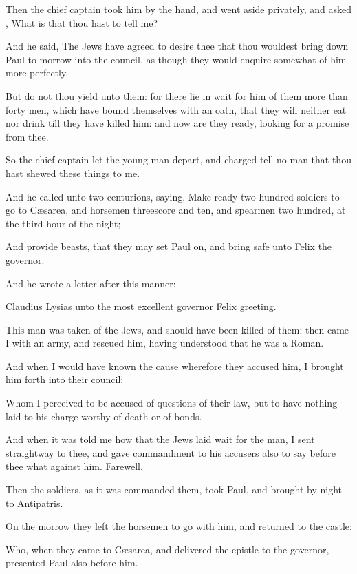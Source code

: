 {Then the chief
captain
took
him by the
hand,
and
went
{}
aside
privately, and
asked
{},
What
is
that thou
hast to
tell
me?

And he
said, The
Jews have
agreed to
desire
thee
that thou wouldest bring
down
Paul to
morrow
into the
council, as
though they would
enquire
somewhat
of
him
more
perfectly.

But
do
not
thou
yield unto
them:
for there lie in
wait for
him
of
them
more than
forty
men,
which have
bound
themselves with an
oath,
that they
will
neither
eat
nor
drink
till they have
killed
him:
and
now are
they
ready, looking
for a
promise
from
thee.

So the chief
captain
{}
let the young
man
depart, and
charged
{}
tell no
man
that thou hast
shewed these
things
to
me.

And
he
called unto
{}
two
centurions,
saying, Make
ready two
hundred
soldiers
to
go
to
Cæsarea,
and
horsemen threescore and
ten,
and
spearmen two
hundred,
at the
third
hour of the
night;

And
provide
{}
beasts,
that they may
set
Paul
on, and
bring
{}
safe
unto
Felix the
governor.

And he
wrote a
letter
after
this
manner:

Claudius
Lysias unto the most
excellent
governor
Felix
{}
greeting.

This
man was
taken
of the
Jews,
and
should have been
killed
of
them: then came
I
with an
army, and
rescued
him, having
understood
that he
was a
Roman.

And when I
would have
known the
cause
wherefore they
accused
him, I
brought
him
forth
into
their
council:

Whom I
perceived to be
accused
of
questions of
their
law,
but to
have
nothing laid to his
charge
worthy of
death
or of
bonds.

And when it was
told
me
how
that the
Jews laid
wait
for the
man, I
sent
straightway
to
thee, and gave
commandment to his
accusers
also to
say
before
thee
what
{}
against
him.
Farewell.

Then the
soldiers,
as it was
commanded
them,
took
Paul, and
brought
{}
by
night
to
Antipatris.

On the
morrow they
left the
horsemen to
go
with
him, and
returned
to the
castle:

Who, when they
came
to
Cæsarea,
and
delivered the
epistle to the
governor,
presented
Paul
also before
him.

}
